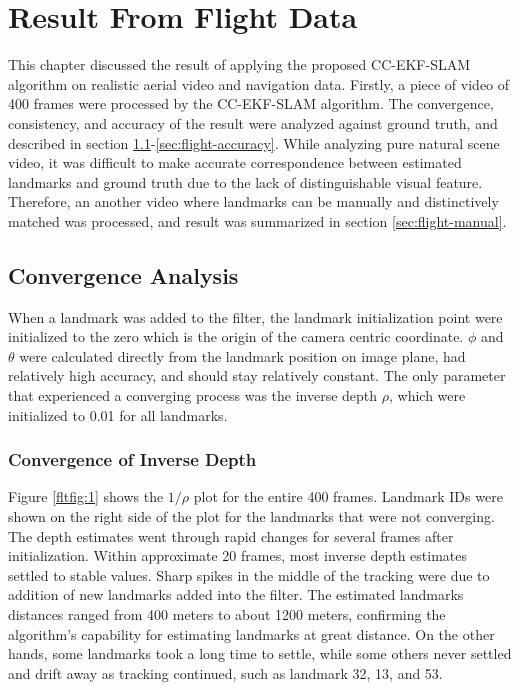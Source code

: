 \chapter{Result From Flight Data}\label{ch:FlightResult}

This chapter discussed the result of applying the proposed CC-EKF-SLAM
algorithm
on realistic aerial video and navigation data. Firstly, a piece of
video of 400 frames were processed by the CC-EKF-SLAM algorithm. The
convergence, consistency, and accuracy of the result were analyzed
against ground truth, and described in section
\ref{sec:flight-converge}-\ref{sec:flight-accuracy}. While
analyzing pure natural scene video, it was difficult to make accurate
correspondence between estimated landmarks and ground truth due to the
lack of distinguishable visual feature. Therefore, an another video
where landmarks can be manually and distinctively matched was
processed, and result was summarized in section \ref{sec:flight-manual}.

\section{Convergence Analysis}\label{sec:flight-converge}
When a landmark was added to the filter, the landmark initialization
point were initialized to the zero which is the origin of the camera
centric coordinate. $\phi$ and $\theta$ were calculated directly from
the landmark position on image plane, had relatively high accuracy, and
should stay relatively constant. The only parameter that experienced
a converging process was the inverse depth $\rho$, which were
initialized to 0.01 for all landmarks.

\subsection{Convergence of Inverse Depth}
Figure \ref{fltfig:1} shows the $1/\rho$ plot for the entire 400
frames. Landmark IDs were shown on the right side of the plot for the
landmarks that were not converging. The depth estimates went through
rapid changes for several frames after initialization. Within
approximate 20 frames, most inverse depth estimates settled to stable
values. Sharp spikes in the middle of the tracking were due to
addition of new landmarks added into the filter. The estimated
landmarks distances ranged from 400 meters to about 1200 meters,
confirming the algorithm's capability for estimating landmarks at
great distance. On the other hands, some landmarks took a long time to
settle, while some others never settled and drift away as tracking
continued, such as landmark 32, 13, and 53.

